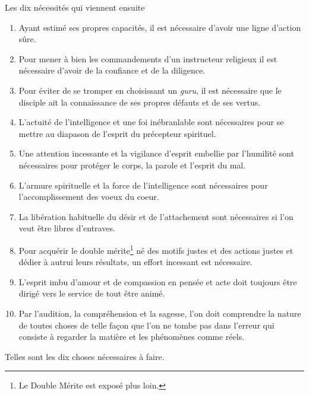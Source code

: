 \documentclass[10pt]{book}
\makeatletter
\renewcommand{\section}{\@startsection{section}{0}{0mm}
   {\baselineskip}
   {\baselineskip}{\normalfont\normalsize\scshape\centering}
}
\makeatother
\begin{document}
\section{Les dix nécessités qui viennent ensuite}
\begin{enumerate}[1.-]
\item Ayant estimé ses propres capacités, il est nécessaire d'avoir une ligne d'action sûre.
\item Pour mener à bien les commandements d'un instructeur religieux il est nécessaire d'avoir de la confiance et de la diligence.
\item Pour éviter de se tromper en choisissant un \textit{guru}, il est nécessaire que le disciple ait la connaissance de ses propres défauts et de ses vertus.
\item L'actuité de l'intelligence et une foi inébranlable sont nécessaires pour se mettre au diapason de l'esprit du précepteur spirituel.
\item Une attention incessante et la vigilance d'esprit embellie par l'humilité sont nécessaires pour protéger le corps, la parole et l'esprit du mal.
\item L'armure spirituelle et la force de l'intelligence sont nécessaires pour l'accomplissement des voeux du coeur.
\item La libération habituelle du désir et de l'attachement sont nécessaires si l'on veut être libres d'entraves.
\item Pour acquérir le double mérite\footnote{Le Double Mérite est exposé plus loin.} né des motifs justes et des actions justes et dédier à autrui leurs résultats, un effort incessant est nécessaire.
\item L'esprit imbu d'amour et de compassion en pensée et acte doit toujours être dirigé vers le service de tout être animé.
\item Par l'audition, la compréhension et la sagesse, l'on doit comprendre la nature de toutes choses de telle façon que l'on ne tombe pas dans l'erreur qui consiste à regarder la matière et les phénomènes comme réels.
\end{enumerate}
Telles sont les dix choses nécessaires à faire.
\end{document}
